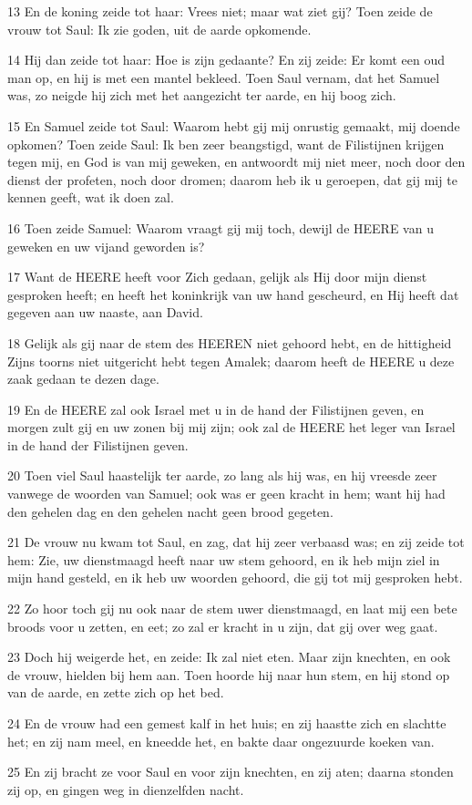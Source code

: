 \par 13 En de koning zeide tot haar: Vrees niet; maar wat ziet gij? Toen zeide de vrouw tot Saul: Ik zie goden, uit de aarde opkomende.
\par 14 Hij dan zeide tot haar: Hoe is zijn gedaante? En zij zeide: Er komt een oud man op, en hij is met een mantel bekleed. Toen Saul vernam, dat het Samuel was, zo neigde hij zich met het aangezicht ter aarde, en hij boog zich.
\par 15 En Samuel zeide tot Saul: Waarom hebt gij mij onrustig gemaakt, mij doende opkomen? Toen zeide Saul: Ik ben zeer beangstigd, want de Filistijnen krijgen tegen mij, en God is van mij geweken, en antwoordt mij niet meer, noch door den dienst der profeten, noch door dromen; daarom heb ik u geroepen, dat gij mij te kennen geeft, wat ik doen zal.
\par 16 Toen zeide Samuel: Waarom vraagt gij mij toch, dewijl de HEERE van u geweken en uw vijand geworden is?
\par 17 Want de HEERE heeft voor Zich gedaan, gelijk als Hij door mijn dienst gesproken heeft; en heeft het koninkrijk van uw hand gescheurd, en Hij heeft dat gegeven aan uw naaste, aan David.
\par 18 Gelijk als gij naar de stem des HEEREN niet gehoord hebt, en de hittigheid Zijns toorns niet uitgericht hebt tegen Amalek; daarom heeft de HEERE u deze zaak gedaan te dezen dage.
\par 19 En de HEERE zal ook Israel met u in de hand der Filistijnen geven, en morgen zult gij en uw zonen bij mij zijn; ook zal de HEERE het leger van Israel in de hand der Filistijnen geven.
\par 20 Toen viel Saul haastelijk ter aarde, zo lang als hij was, en hij vreesde zeer vanwege de woorden van Samuel; ook was er geen kracht in hem; want hij had den gehelen dag en den gehelen nacht geen brood gegeten.
\par 21 De vrouw nu kwam tot Saul, en zag, dat hij zeer verbaasd was; en zij zeide tot hem: Zie, uw dienstmaagd heeft naar uw stem gehoord, en ik heb mijn ziel in mijn hand gesteld, en ik heb uw woorden gehoord, die gij tot mij gesproken hebt.
\par 22 Zo hoor toch gij nu ook naar de stem uwer dienstmaagd, en laat mij een bete broods voor u zetten, en eet; zo zal er kracht in u zijn, dat gij over weg gaat.
\par 23 Doch hij weigerde het, en zeide: Ik zal niet eten. Maar zijn knechten, en ook de vrouw, hielden bij hem aan. Toen hoorde hij naar hun stem, en hij stond op van de aarde, en zette zich op het bed.
\par 24 En de vrouw had een gemest kalf in het huis; en zij haastte zich en slachtte het; en zij nam meel, en kneedde het, en bakte daar ongezuurde koeken van.
\par 25 En zij bracht ze voor Saul en voor zijn knechten, en zij aten; daarna stonden zij op, en gingen weg in dienzelfden nacht.

